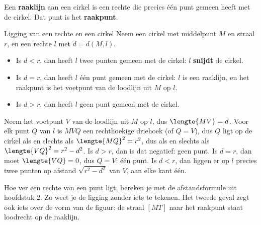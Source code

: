 \begin{theorie}
Een \textbf{\textcolor{accent}{raaklijn}} aan een cirkel is een rechte die precies één punt gemeen heeft met de cirkel. Dat punt is het \textbf{\textcolor{accent}{raakpunt}}.
\begin{stelling}{Ligging van een rechte en een cirkel}
Neem een cirkel met middelpunt $M$ en straal $r$, en een rechte $l$ met $d = d(M, l)$.
\begin{itemize}[nosep,leftmargin=5mm]
\item Is $d < r$, dan heeft $l$ twee punten gemeen met de cirkel: $l$ \textbf{\textcolor{accent}{snijdt}} de cirkel.
\item Is $d = r$, dan heeft $l$ één punt gemeen met de cirkel: $l$ is een raaklijn, en het raakpunt is het voetpunt van de loodlijn uit $M$ op $l$.
\item Is $d > r$, dan heeft $l$ geen punt gemeen met de cirkel.
\end{itemize}
\end{stelling}
\begin{bewijs}
Neem het voetpunt $V$ van de loodlijn uit $M$ op $l$, dus $\lengte{MV} = d$. Voor elk punt $Q$ van $l$ is $MVQ$ een rechthoekige driehoek (of $Q = V$), dus
$Q$ ligt op de cirkel als en slechts als $\lengte{MQ}^2 = r^2$, dus als en slechts als $\lengte{VQ}^2 = r^2 - d^2$. Is $d > r$, dan is dat negatief: geen punt. Is $d = r$, dan moet $\lengte{VQ} = 0$, dus $Q = V$: één punt. Is $d < r$, dan liggen er op $l$ precies twee punten op afstand $\sqrt{r^2 - d^2}$ van $V$, aan elke kant één.
\end{bewijs}
\end{theorie}

Hoe ver een rechte van een punt ligt, bereken je met de afstandsformule uit hoofdstuk 2. Zo weet je de ligging zonder iets te tekenen. Het tweede geval zegt ook iets over de vorm van de figuur: de straal $[MT]$ naar het raakpunt staat loodrecht op de raaklijn.


